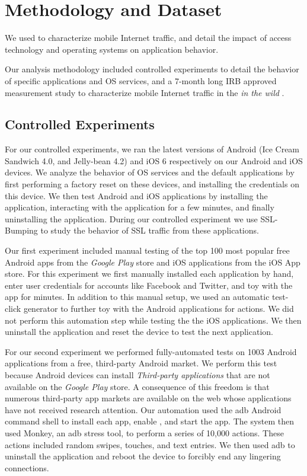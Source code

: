 \section{Methodology and Dataset}
\label{sec:Methodology}

We used \platname to characterize mobile Internet traffic, and detail the impact of access technology and operating systems on application behavior. 

Our analysis methodology included controlled experiments to detail the behavior of specific applications and OS services, and a 7-month long IRB approved measurement study to characterize mobile Internet traffic in the \emph{in the wild} . 

\subsection{Controlled Experiments}

For our controlled experiments, we ran the latest versions of Android (Ice Cream Sandwich 4.0, and Jelly-bean 4.2) and iOS 6 respectively on our Android and iOS devices. 
We analyze the behavior of OS services and the default applications by first performing a factory reset on these devices, and installing the \platname credentials on this device.
We then test Android and iOS applications by installing the application, interacting with the application for a few minutes, and finally uninstalling the  application. 
During our controlled experiment we use SSL-Bumping to study the behavior of SSL traffic from these applications. 

Our first experiment included manual testing of the top 100 most popular free Android apps from the \emph{Google Play} store and \tbd{} iOS applications from the iOS App store.
For this experiment we first manually installed each application by hand, enter user credentials for accounts like Facebook and Twitter, and toy with the app for \tbd{} minutes. 
In addition to this manual setup, we used an automatic test-click generator to further toy with the Android applications for \tbd{} actions. 
We did not perform this automation step while testing the the iOS applications.
We then uninstall the application and reset the device to test the next application. 

For our second experiment we performed fully-automated tests on 1003 Android applications from a free, third-party Android market.
We perform this test because Android devices can install \emph{Third-party applications} that are not available on the \emph{Google Play} store.
A consequence of this freedom is that numerous third-party app markets are available on the web whose applications have not received research attention.
Our automation used the adb Android command shell to install each app, enable \platname, and start the app.
The system then used Monkey, an adb stress tool, to perform a series of 10,000 actions. 
These actions included random swipes, touches, and text entries.
We then used adb to uninstall the application and reboot the device to forcibly end any lingering connections.

